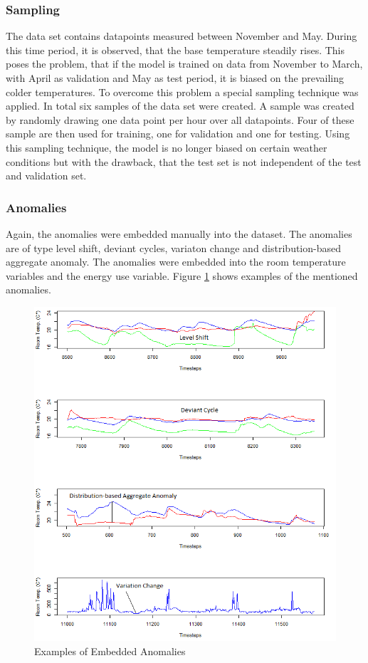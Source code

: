 \subsubsection{Sampling}
The data set contains datapoints measured between November and May. During this time period, it is observed, that the base temperature steadily rises. This poses the problem, that if the model is trained on data from November to March, with April as validation and May as test period, it is biased on the prevailing colder temperatures. To overcome this problem a special sampling technique was applied. In total six samples of the data set were created. A sample was created by randomly drawing one data point per hour over all datapoints. Four of these sample are then used for training, one for validation and one for testing. Using this sampling technique, the model is no longer biased on certain weather conditions but with the drawback, that the test set is not independent of the test and validation set.   

\subsubsection{Anomalies}
Again, the anomalies were embedded manually into the dataset. The anomalies are of type level shift, deviant cycles, variaton change and distribution-based aggregate anomaly. The anomalies were embedded into the room temperature variables and the energy use variable. Figure \ref{fig:temp_anomalies} shows examples of the mentioned anomalies.

\begin{figure}[h]
	\centering
	\includegraphics[scale=0.7]{Figures/temp_anomalies}
	\decoRule
	\caption[Temperature Dataset Anomalies]{Examples of Embedded Anomalies \parencite{Own}}
	\label{fig:temp_anomalies}
\end{figure}


